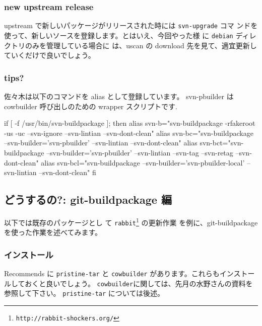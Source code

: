 \documentclass[mingoth,a4paper]{jsarticle}
\begin{document}
\subsubsection{new upstream release}

upstream で新しいパッケージがリリースされた時には {\tt{svn-upgrade}} コマ
ンドを使って、新しいソースを登録します。とはいえ、今回やった様
に {\tt{debian}} ディレクトリのみを管理している場合に
は、uscan の download 先を見て、適宜更新していくだけで良いでしょう。

\subsubsection{tips?}

佐々木は以下のコマンドを alias として登録しています。
svn-pbuilder は cowbuilder 呼び出しのための wrapper スクリプトです.
\begin{commandline}
if [ -f /usr/bin/svn-buildpackage ]; then
  alias svn-b="svn-buildpackage -rfakeroot -us -uc --svn-ignore --svn-lintian --svn-dont-clean"
  alias svn-bc="svn-buildpackage --svn-builder='svn-pbuilder' --svn-lintian --svn-dont-clean"
  alias svn-bct="svn-buildpackage --svn-builder='svn-pbuilder' --svn-lintian --svn-tag --svn-retag --svn-dont-clean"
  alias svn-bcl="svn-buildpackage --svn-builder='svn-pbuilder-local' --svn-lintian --svn-dont-clean"
fi
\end{commandline}

\subsection{どうするの?: git-buildpackage 編}

以下では既存のパッケージとし
て {\tt{rabbit}}\footnote{{\tt{http://rabbit-shockers.org/}}} の更新作業
を例に、git-buildpackage を使った作業を述べてみます。

\subsubsection{インストール}

Recommends に {\tt{pristine-tar}} と {\tt{cowbuilder}} があります。これらもインストールしておくと良いでしょう。
{\tt{cowbuilder}}に関しては、先月の水野さんの資料を参照して下さい。
{\tt{pristine-tar}} については後述。
\end{document}
